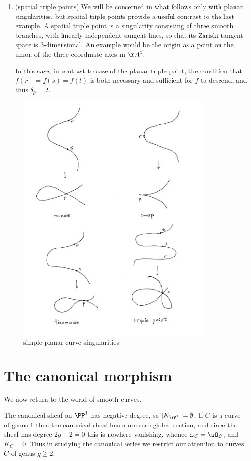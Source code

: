 \begin{enumerate}
\item (spatial triple points) We will be concerned in what follows only with planar singularities, but spatial triple points provide a useful contrast to the last example. A spatial triple point is a singularity consisting of three smooth branches, with linearly independent tangent lines, so that its Zariski tangent space is 3-dimensional. An example would be the origin as a point on the union of the three coordinate axes in $\AA^3$.

In this case, in contrast to case of the planar triple point, the condition that $f(r)=f(s)=f(t)$ is both necessary and sufficient for $f$ to descend, and thus  $\delta_p=2$.

\end{enumerate}

\begin{figure}
 \caption{simple planar curve singularities}
\centerline {\includegraphics[height=5in]{"Fig2.2"}}
\end{figure}


\section{The canonical morphism}

We now return to the world of smooth curves.

 The canonical sheaf on $\PP^1$ has negative degree, so $|K_{\PP^1}| = \emptyset$. If $C$ is a curve
 of genus $1$ then the canonical sheaf     has a nonzero global section, and since the sheaf has degree $2g-2=0$ this is nowhere vanishing, whence
 $\omega_C = \sO_C$, and $K_C = 0$. Thus in studying the canonical series we restrict our attention to curves $C$ of genus $g\geq 2$. 
 
